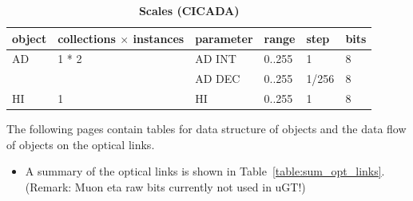 \documentclass{cmspaper}
\begin{document}
\begin{table}[ht]
\caption{\bf Scales (CICADA)}
\vspace{5mm}
\centering
\begin{tabular}{|p{2.0cm}| l | p{2.0cm} | p{2.0cm} | p{2.0cm} | l |}
\hline
object	&	collections $\times$ instances	&	parameter	&	range	&	step	&	bits \\
\hline\hline
AD 	   &	1 * 2	& AD INT	    &	0..255	   &	1	  &	8  \\
	   &	        & AD DEC	    &	0..255	   &	1/256  &	8  \\
HI 	   &	1   	& HI 	        &	0..255	   &	1	  &	8  \\
\hline
\end{tabular}
\label{table:scales_table_4}
\end{table}

\clearpage

The following pages contain tables for data structure of objects and the data flow of objects on the optical links.

\begin{itemize}
\item A summary of the optical links is shown in Table~\ref{table:sum_opt_links}. (Remark: Muon eta raw bits currently not used in uGT!)
\end{itemize}
\end{document}
